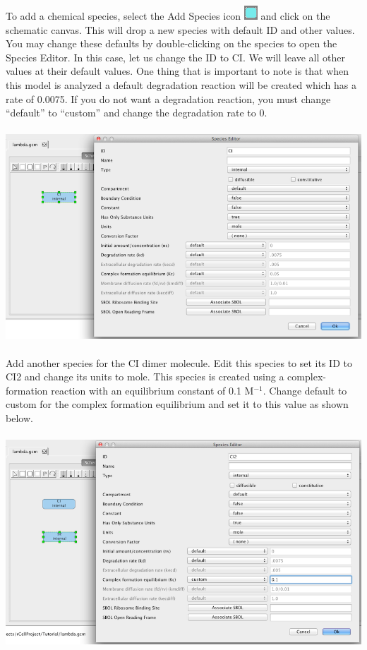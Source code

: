 \documentclass[titlepage,11pt]{article}
\begin{document}
To add a chemical species, select the Add Species icon \includegraphics{../gui/icons/modelview/add_species_selected} and click on the schematic canvas.  This will drop a new species with default ID and other values.  You may change these defaults by double-clicking on the species to open the Species Editor.  In this case, let us change the ID to CI.  We will leave all other values at their default values.  One thing that is important to note is that when this model is analyzed a default degradation reaction will be created which has a rate of 0.0075.  If you do not want a degradation reaction, you must change ``default'' to ``custom'' and change the degradation rate to 0.

\begin{center}
\includegraphics[height=80mm]{screenshots/species}
\end{center}

Add another species for the CI dimer molecule.  Edit this species to set its ID to CI2 and change its units to mole.  This species is created using a complex-formation reaction with an equilibrium constant of 0.1 M$^{-1}$.  Change default to custom for the complex formation equilibrium and set it to this value as shown below.

\begin{center}
\includegraphics[height=80mm]{screenshots/species2} 
\end{center}
\end{document}
